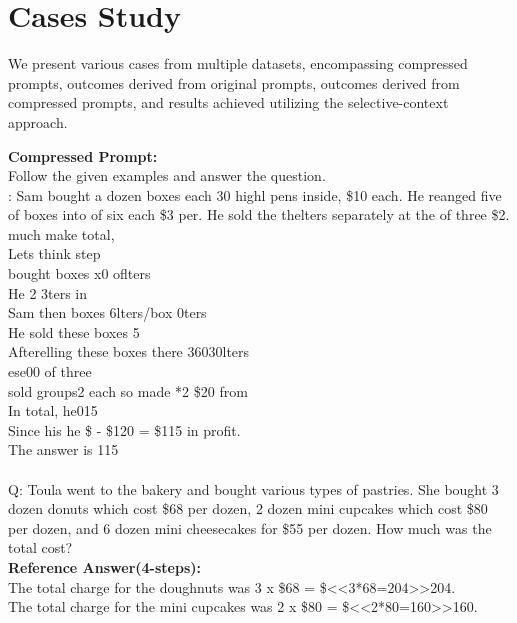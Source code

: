 \section{Cases Study}
\label{sec:cases_study}

We present various cases from multiple datasets, encompassing compressed prompts, outcomes derived from original prompts, outcomes derived from compressed prompts, and results achieved utilizing the selective-context approach.


\begin{figure*}[htb]
    \begin{tcolorbox}
    \textbf{Compressed Prompt:}\\
    Follow the given examples and answer the question.\\
    : Sam bought a dozen boxes each 30 highl pens inside, \$10 each. He reanged five of boxes into of six each \$3 per. He sold the thelters separately at the of three \$2. much make total,\\
    Lets think step\\
     bought boxes x0 oflters\\
    He 2 3ters in\\
    Sam then boxes 6lters/box 0ters\\
    He sold these boxes 5\\
    Afterelling these boxes there 36030lters\\
    ese00 of three\\
     sold groups2 each so made *2 \$20 from\\
    In total, he015\\
    Since his he \$ - \$120 = \$115 in profit.\\
    The answer is 115\\\\
    Q: Toula went to the bakery and bought various types of pastries. She bought 3 dozen donuts which cost \$68 per dozen, 2 dozen mini cupcakes which cost \$80 per dozen, and 6 dozen mini cheesecakes for \$55 per dozen. How much was the total cost?\\
    \textbf{Reference Answer(4-steps):}\\
    The total charge for the doughnuts was 3 x \$68 = \$<<3*68=204>>204.\\
    The total charge for the mini cupcakes was 2 x \$80 = \$<<2*80=160>>160.\\

\end{tcolorbox}
\end{figure*}
